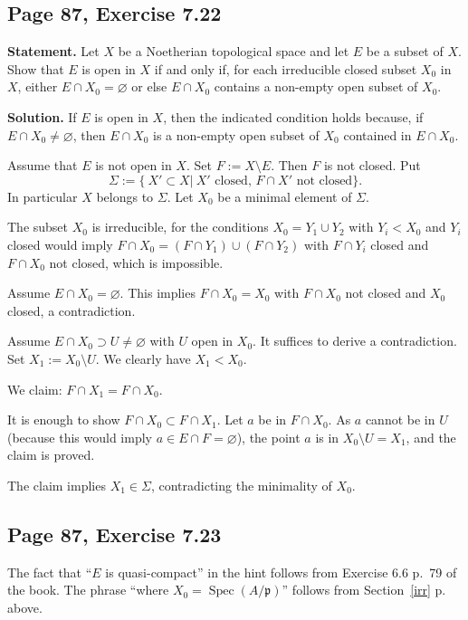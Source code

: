 \documentclass[parskip=half,fontsize=12pt]{scrartcl}%
\newcommand{\mf}{\mathfrak}
\newcommand{\ppp}{\mf p}
\newcommand{\Spec}{\operatorname{Spec}}\newcommand{\Sp}{\operatorname{Spec}}
\begin{document}
\subsection{Page 87, Exercise 7.22}%

\textbf{Statement.} Let $X$ be a Noetherian topological space and let $E$ be a subset of $X$. Show that $E$ is open in $X$ if and only if, for each irreducible closed subset $X_0$ in $X$, either $E\cap X_0=\varnothing$ or else $E\cap X_0$ contains a non-empty open subset of $X_0$.

\textbf{Solution.} If $E$ is open in $X$, then the indicated condition holds because, if $E\cap X_0\ne\varnothing$, then $E\cap X_0$ is a non-empty open subset of $X_0$ contained in $E\cap X_0$. %

Assume that $E$ is not open in $X$. Set $F:=X\setminus E$. Then $F$ is not closed. Put 
$$
\Sigma:=\{\ X'\subset X|\ X'\text{ closed, }F\cap X'\text{ not closed}\}.
$$ 
In particular $X$ belongs to $\Sigma$. Let $X_0$ be a minimal element of $\Sigma$. 

The subset $X_0$ is irreducible, for the conditions $X_0=Y_1\cup Y_2$ with $Y_i<X_0$ and $Y_i$ closed would imply $F\cap X_0=(F\cap Y_1)\cup(F\cap Y_2)$ with $F\cap Y_i$ closed and $F\cap X_0$ not closed, which is impossible.

Assume $E\cap X_0=\varnothing$. This implies $F\cap X_0=X_0$ with $F\cap X_0$ not closed and $X_0$ closed, a contradiction.

Assume $E\cap X_0\supset U\ne\varnothing$ with $U$ open in $X_0$. It suffices to derive a contradiction. Set $X_1:=X_0\setminus U$. We clearly have $X_1<X_0$. 

We claim: $F\cap X_1=F\cap X_0$. 

It is enough to show $F\cap X_0\subset F\cap X_1$. Let $a$ be in $F\cap X_0$. As $a$ cannot be in $U$ (because this would imply $a\in E\cap F=\varnothing$), the point $a$ is in $X_0\setminus U=X_1$, and the claim is proved.

The claim implies $X_1\in\Sigma$, contradicting the minimality of $X_0$.

\subsection{Page 87, Exercise 7.23}%

The fact that ``$E$ is quasi-compact'' in the hint follows from Exercise 6.6 p.~79 of the book. The phrase ``where $X_0=\Spec(A/\ppp)$'' follows from Section~\ref{irr} p.~\pageref{irr} above. %
\end{document}
